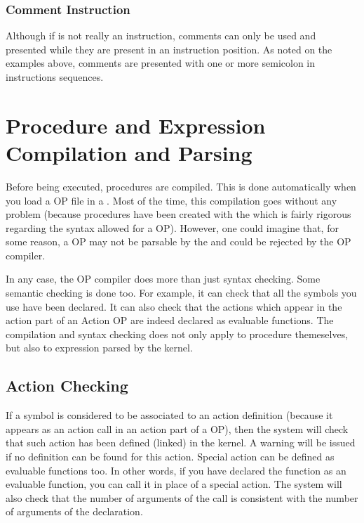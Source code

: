\subsubsection{Comment Instruction}

Although if is not really an instruction, comments can only be used and
presented while they are present in an instruction position. As noted on the
examples above, comments are presented with one or more semicolon \samp{;} in
instructions sequences.

\section{Procedure and Expression Compilation and Parsing}

Before being executed, procedures are compiled. This is done
automatically when you load a OP file in a \CPK{}. Most of the time, this
compilation goes without any problem (because procedures have been
created with the \OPE{} which is fairly rigorous regarding the syntax
allowed for a OP). However, one could imagine that, for some reason, a OP
may not be parsable by the \CPK{} and could be rejected by the OP compiler.

In any case, the OP compiler does more than just syntax checking. Some
semantic checking is done too. For example, it can check that all the
symbols you use have been declared. It can also check that the actions
which appear in the action part of an Action OP are indeed declared as
evaluable functions. The compilation and syntax checking does not only apply to
procedure themeselves, but also to expression parsed by the kernel.



\subsection{Action Checking}

If a symbol is considered to be associated to an action definition
(because it appears as an action call in an action part of a OP), then
the system will check that such action has been defined (linked) in the
kernel. A warning will be issued if no definition can be found for this
action. Special action can be defined as evaluable functions too. In other
words, if you have declared the function  as an evaluable
function, you can call it in place of a special action. The system will also
check that the number of arguments of the call is consistent with the number of
arguments of the declaration.

